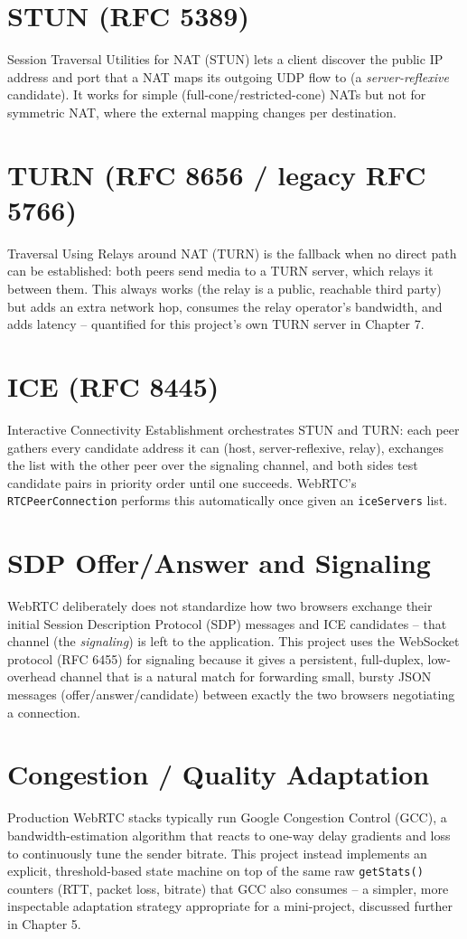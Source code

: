 \documentclass[12pt,a4paper]{report}
\begin{document}
\section{STUN (RFC 5389)}
Session Traversal Utilities for NAT (STUN) lets a client discover the public
IP address and port that a NAT maps its outgoing UDP flow to (a \emph{server-reflexive}
candidate). It works for simple (full-cone/restricted-cone) NATs but not for symmetric NAT,
where the external mapping changes per destination.

\section{TURN (RFC 8656 / legacy RFC 5766)}
Traversal Using Relays around NAT (TURN) is the fallback when no direct path can be
established: both peers send media to a TURN server, which relays it between them. This
always works (the relay is a public, reachable third party) but adds an extra network hop,
consumes the relay operator's bandwidth, and adds latency -- quantified for this project's
own TURN server in Chapter 7.

\section{ICE (RFC 8445)}
Interactive Connectivity Establishment orchestrates STUN and TURN: each peer gathers every
candidate address it can (host, server-reflexive, relay), exchanges the list with the other
peer over the signaling channel, and both sides test candidate pairs in priority order until
one succeeds. WebRTC's \texttt{RTCPeerConnection} performs this automatically once given an
\texttt{iceServers} list.

\section{SDP Offer/Answer and Signaling}
WebRTC deliberately does not standardize how two browsers exchange their initial Session
Description Protocol (SDP) messages and ICE candidates -- that channel (the
\emph{signaling}) is left to the application. This project uses the WebSocket protocol
(RFC 6455) for signaling because it gives a persistent, full-duplex, low-overhead channel
that is a natural match for forwarding small, bursty JSON messages (offer/answer/candidate)
between exactly the two browsers negotiating a connection.

\section{Congestion / Quality Adaptation}
Production WebRTC stacks typically run Google Congestion Control (GCC), a
bandwidth-estimation algorithm that reacts to one-way delay gradients and loss to
continuously tune the sender bitrate. This project instead implements an explicit,
threshold-based state machine on top of the same raw \texttt{getStats()} counters (RTT,
packet loss, bitrate) that GCC also consumes -- a simpler, more inspectable adaptation
strategy appropriate for a mini-project, discussed further in Chapter 5.
\end{document}
